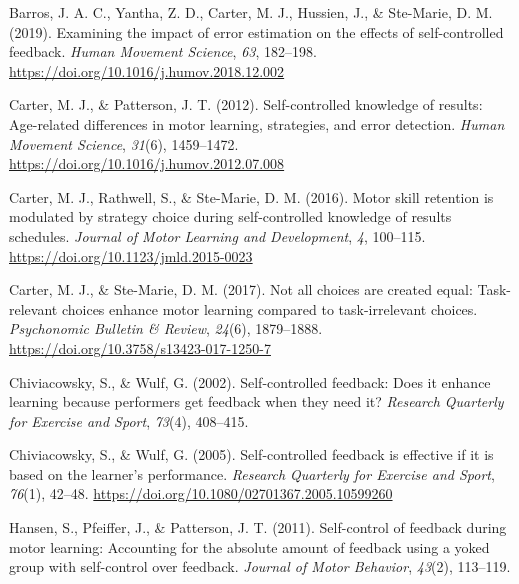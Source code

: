 \documentclass[final]{article}
\newlength{\cslhangindent}
\newenvironment{CSLReferences}[2] %
 {%
  \setlength{\parindent}{0pt}
  \ifodd #1 \everypar{\setlength{\hangindent}{\cslhangindent}}\ignorespaces\fi
  \ifnum #2 > 0
  \setlength{\parskip}{#2\baselineskip}
  \fi
 }%
 {}
\begin{document}
\hypertarget{refs}{}
\begin{CSLReferences}{1}{0}
\leavevmode{}%
Barros, J. A. C., Yantha, Z. D., Carter, M. J., Hussien, J., \& Ste-Marie, D. M. (2019). Examining the impact of error estimation on the effects of self-controlled feedback. \emph{Human Movement Science}, \emph{63}, 182--198. \url{https://doi.org/10.1016/j.humov.2018.12.002}

\leavevmode{}%
Carter, M. J., \& Patterson, J. T. (2012). Self-controlled knowledge of results: {Age-related} differences in motor learning, strategies, and error detection. \emph{Human Movement Science}, \emph{31}(6), 1459--1472. \url{https://doi.org/10.1016/j.humov.2012.07.008}

\leavevmode{}%
Carter, M. J., Rathwell, S., \& Ste-Marie, D. M. (2016). Motor skill retention is modulated by strategy choice during self-controlled knowledge of results schedules. \emph{Journal of Motor Learning and Development}, \emph{4}, 100--115. \url{https://doi.org/10.1123/jmld.2015-0023}

\leavevmode{}%
Carter, M. J., \& Ste-Marie, D. M. (2017). Not all choices are created equal: {Task}-relevant choices enhance motor learning compared to task-irrelevant choices. \emph{Psychonomic Bulletin \& Review}, \emph{24}(6), 1879--1888. \url{https://doi.org/10.3758/s13423-017-1250-7}

\leavevmode{}%
Chiviacowsky, S., \& Wulf, G. (2002). Self-controlled feedback: Does it enhance learning because performers get feedback when they need it? \emph{Research Quarterly for Exercise and Sport}, \emph{73}(4), 408--415.

\leavevmode{}%
Chiviacowsky, S., \& Wulf, G. (2005). Self-controlled feedback is effective if it is based on the learner's performance. \emph{Research Quarterly for Exercise and Sport}, \emph{76}(1), 42--48. \url{https://doi.org/10.1080/02701367.2005.10599260}

\leavevmode{}%
Hansen, S., Pfeiffer, J., \& Patterson, J. T. (2011). Self-control of feedback during motor learning: Accounting for the absolute amount of feedback using a yoked group with self-control over feedback. \emph{Journal of Motor Behavior}, \emph{43}(2), 113--119.


\end{CSLReferences}
\end{document}
